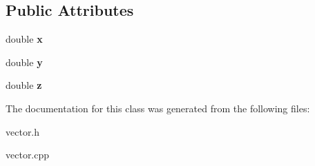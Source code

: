 \subsection*{Public Attributes}
\begin{DoxyCompactItemize}
\item 
\hypertarget{classvector3d_af4cca8e451e9f8fa283be0d920bb7ed2}{
double {\bfseries x}}
\label{classvector3d_af4cca8e451e9f8fa283be0d920bb7ed2}

\item 
\hypertarget{classvector3d_a30cf53e8b0ca4463eb9eeece5630f195}{
double {\bfseries y}}
\label{classvector3d_a30cf53e8b0ca4463eb9eeece5630f195}

\item 
\hypertarget{classvector3d_a991b36f4747b1e65b90de85ebf39a2f5}{
double {\bfseries z}}
\label{classvector3d_a991b36f4747b1e65b90de85ebf39a2f5}

\end{DoxyCompactItemize}


The documentation for this class was generated from the following files:\begin{DoxyCompactItemize}
\item 
vector.h\item 
vector.cpp\end{DoxyCompactItemize}
